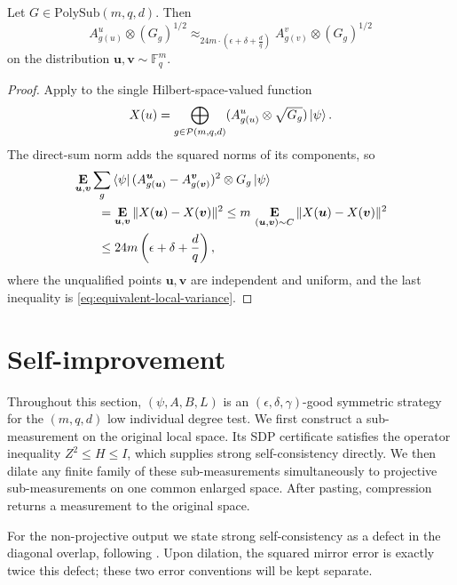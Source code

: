 \documentclass[11pt]{article}
\theoremstyle{definition}
\newcommand{\E}{\mathop{\bf E\/}}
\newcommand{\F}{\mathbb F}
\newcommand{\eps}{\epsilon}
\newcommand{\calP}{\mathcal{P}}
\newcommand{\bu}{\boldsymbol{u}}
\newcommand{\bv}{\boldsymbol{v}}
\newcommand{\polyfunc}[3]{\calP(#1, #2, #3)}
\newcommand{\polysub}[3]{\mathrm{PolySub}(#1, #2, #3)}
\begin{document}
\begin{lemma}\label{lem:global-variance-of-points}
Let $G \in \polysub{m}{q}{d}$.  Then
\begin{equation}\label{eq:global-variance-of-points-equation}
A^u_{g(u)} \otimes (G_g)^{1/2} \approx_{24m\cdot(\eps + \delta + \frac{d}{q})} A^v_{g(v)} \otimes (G_g)^{1/2}
\end{equation}
on the distribution $\bu, \bv \sim \F_q^m$.
\end{lemma}
\begin{proof}
Apply  to the single Hilbert-space-valued
function
\[
 X(u)=\bigoplus_{g\in\polyfunc{m}{q}{d}}
       (A^u_{g(u)}\otimes\sqrt{G_g})\ket\psi.
\]
The direct-sum norm adds the squared norms of its components, so
\begin{equation}\label{eq:global-variance-target}
 \begin{aligned}
 &\E_{\bu,\bv}\sum_g\bra\psi
       (A^{\bu}_{g(\bu)}-A^{\bv}_{g(\bv)})^2\otimes G_g\ket\psi\\
 &\qquad=\E_{\bu,\bv}\|X(\bu)-X(\bv)\|^2
 \leq m\,\E_{(\bu,\bv)\sim C}\|X(\bu)-X(\bv)\|^2\\
 &\qquad\leq24m\left(\eps+\delta+\frac dq\right),
 \end{aligned}
\end{equation}
where the unqualified points $\bu,\bv$ are independent and uniform,
and the last inequality is \eqref{eq:equivalent-local-variance}.
\end{proof}

\section{Self-improvement}
\label{sec:self-improvement}

Throughout this section, $(\psi,A,B,L)$ is an
$(\eps,\delta,\gamma)$-good symmetric strategy for the $(m,q,d)$ low
individual degree test.  We first construct a sub-measurement on the
original local space.  Its SDP certificate satisfies the
operator inequality $Z^2\leq H\leq I$, which supplies strong
self-consistency directly.  We then dilate any finite family of these
sub-measurements simultaneously to projective sub-measurements on one
common enlarged space.  After pasting, compression returns a
measurement to the original space.

For the non-projective output we state strong self-consistency as a
defect in the diagonal overlap, following
.  Upon dilation, the squared mirror
error is exactly twice this defect; these two error conventions will
be kept separate.
\end{document}
